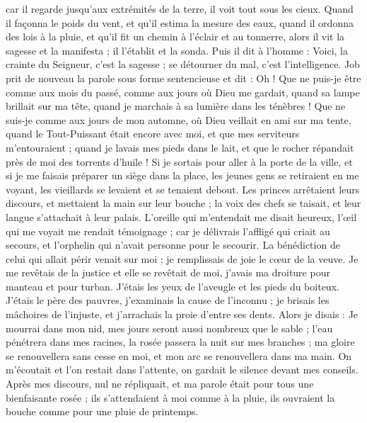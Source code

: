 \begin{multicols}{2}
car il regarde jusqu'aux extrémités de la terre, il voit tout sous les cieux.
Quand il façonna le poids du vent, et qu'il estima la mesure des eaux,
quand il ordonna des lois à la pluie, et qu'il fit un chemin à l'éclair et au tonnerre,
alors il vit la sagesse et la manifesta ; il l'établit et la sonda.
Puis il dit à l'homme : Voici, la crainte du Seigneur, c'est la sagesse ; se détourner du mal, c'est l'intelligence.
\VerseOne{}Job prit de nouveau la parole sous forme sentencieuse et dit :
Oh ! Que ne puis-je être comme aux mois du passé, comme aux jours où Dieu me gardait,
quand sa lampe brillait sur ma tête, quand je marchais à sa lumière dans les ténèbres !
Que ne suis-je comme aux jours de mon automne, où Dieu veillait en ami sur ma tente,
quand le Tout-Puissant était encore avec moi, et que mes serviteurs m'entouraient ;
quand je lavais mes pieds dans le lait, et que le rocher répandait près de moi des torrents d'huile !
Si je sortais pour aller à la porte de la ville, et si je me faisais préparer un siège dans la place,
les jeunes gens se retiraient en me voyant, les vieillards se levaient et se tenaient debout.
Les princes arrêtaient leurs discours, et mettaient la main sur leur bouche ;
la voix des chefs se taisait, et leur langue s'attachait à leur palais.
L'oreille qui m'entendait me disait heureux, l'œil qui me voyait me rendait témoignage ;
car je délivrais l'affligé qui criait au secours, et l'orphelin qui n'avait personne pour le secourir.
La bénédiction de celui qui allait périr venait sur moi ; je remplissais de joie le cœur de la veuve.
Je me revêtais de la justice et elle se revêtait de moi, j'avais ma droiture pour manteau et pour turban.
J'étais les yeux de l'aveugle et les pieds du boiteux.
J'étais le père des pauvres, j'examinais la cause de l'inconnu ;
je brisais les mâchoires de l'injuste, et j'arrachais la proie d'entre ses dents.
Alors je disais : Je mourrai dans mon nid, mes jours seront aussi nombreux que le sable ;
l'eau pénétrera dans mes racines, la rosée passera la nuit sur mes branches ;
ma gloire se renouvellera sans cesse en moi, et mon arc se renouvellera dans ma main.
On m'écoutait et l'on restait dans l'attente, on gardait le silence devant mes conseils.
Après mes discours, nul ne répliquait, et ma parole était pour tous une bienfaisante rosée ;
ils s'attendaient à moi comme à la pluie, ils ouvraient la bouche comme pour une pluie de printemps.

\end{multicols}
